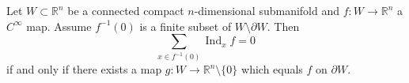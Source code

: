 Let $W \subset \mathbb{R}^{n}$ be a connected compact $n$-dimensional submanifold and $f \colon W \to \mathbb{R}^{n}$ a $C^{\infty}$ map. Assume $f^{-1}(0)$ is a finite subset of $W \setminus \partial W$. Then
$$
\sum_{x \in f^{-1}(0)} \operatorname{Ind}_{x} f = 0
$$
if and only if there exists a map $g \colon W \to \mathbb{R}^{n} \setminus \{0\}$ which equals $f$ on $\partial W$.

